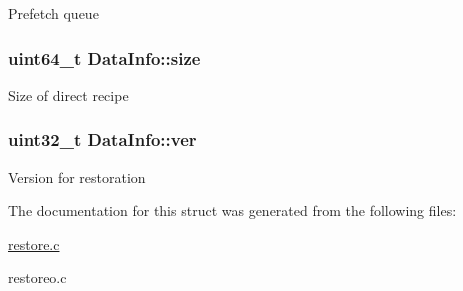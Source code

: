 \-Prefetch queue \hypertarget{structDataInfo_a48e1e104444c91f1ed5a8c5063123da2}{
\subsubsection[{size}]{\setlength{\rightskip}{0pt plus 5cm}uint64\-\_\-t {\bf \-Data\-Info\-::size}}}\label{structDataInfo_a48e1e104444c91f1ed5a8c5063123da2}
\-Size of direct recipe \hypertarget{structDataInfo_a1da1223452f43d4d819c1f1206c4df0f}{
\subsubsection[{ver}]{\setlength{\rightskip}{0pt plus 5cm}uint32\-\_\-t {\bf \-Data\-Info\-::ver}}}\label{structDataInfo_a1da1223452f43d4d819c1f1206c4df0f}
\-Version for restoration 

\-The documentation for this struct was generated from the following files\-:\begin{DoxyCompactItemize}
\item 
\hyperlink{restore_8c}{restore.\-c}\item 
restoreo.\-c\end{DoxyCompactItemize}
